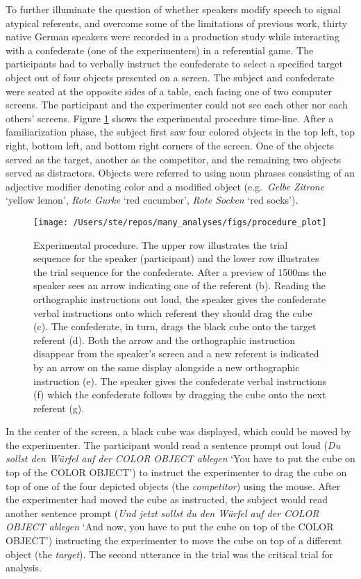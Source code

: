 \documentclass[Review,times,sageh]{sagej}
\begin{document}
To further illuminate the question of whether speakers modify speech to signal atypical referents, and overcome some of the limitations of previous work, thirty native German speakers were recorded in a production study while interacting with a confederate (one of the experimenters) in a referential game.
The participants had to verbally instruct the confederate to select a specified target object out of four objects presented on a screen.
The subject and confederate were seated at the opposite sides of a table, each facing one of two computer screens.
The participant and the experimenter could not see each other nor each others' screens.
Figure \ref{fig:procedural} shows the experimental procedure time-line.
After a familiarization phase, the subject first saw four colored objects in the top left, top right, bottom left, and bottom right corners of the screen.
One of the objects served as the target, another as the competitor, and the remaining two objects served as distractors.
Objects were referred to using noun phrases consisting of an adjective modifier denoting color and a modified object (e.g.~\emph{Gelbe Zitrone} `yellow lemon', \emph{Rote Gurke} `red cucumber', \emph{Rote Socken} `red socks').



\begin{figure}
\texttt{[image: /Users/ste/repos/many\_analyses/figs/procedure\_plot]} \caption{Experimental procedure. The upper row illustrates the trial sequence for the speaker (participant) and the lower row illustrates the trial sequence for the confederate. After a preview of 1500ms the speaker sees an arrow indicating one of the referent (b). Reading the orthographic instructions out loud, the speaker gives the confederate verbal instructions onto which referent they should drag the cube (c). The confederate, in turn, drags the black cube onto the target referent (d). Both the arrow and the orthographic instruction disappear from the speaker's screen and a new referent is indicated by an arrow on the same display alongside a new orthographic instruction (e). The speaker gives the confederate verbal instructions (f) which the confederate follows by dragging the cube onto the next referent (g).}\label{fig:procedural}
\end{figure}

In the center of the screen, a black cube was displayed, which could be moved by the experimenter.
The participant would read a sentence prompt out loud (\emph{Du sollst den Würfel auf der COLOR OBJECT ablegen} `You have to put the cube on top of the COLOR OBJECT') to instruct the experimenter to drag the cube on top of one of the four depicted objects (the \emph{competitor}) using the mouse.
After the experimenter had moved the cube as instructed, the subject would read another sentence prompt (\emph{Und jetzt sollst du den Würfel auf der COLOR OBJECT ablegen} `And now, you have to put the cube on top of the COLOR OBJECT') instructing the experimenter to move the cube on top of a different object (the \emph{target}).
The second utterance in the trial was the critical trial for analysis.
\end{document}
